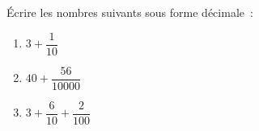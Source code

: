 \documentclass[exercice]{thedocument}%
\begin{document}
%
Écrire les nombres suivants sous forme décimale~:
\begin{enumerate}
    \item $3+\dfrac1{10}$
    \item $40+\dfrac{56}{10000}$
    \item $3+\dfrac6{10}+\dfrac2{100}$
\end{enumerate}
\end{document}
